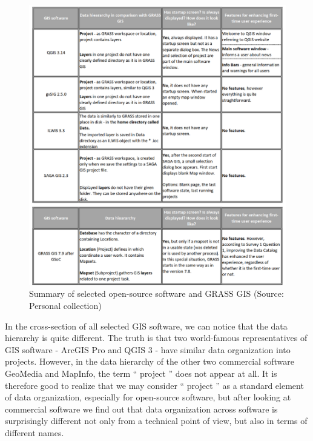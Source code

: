 \documentclass[a4paper,10pt,twoside]{article}
\begin{document}
\vspace{0.3cm}
\begin{figure}[hbt!] 
\begin{center}
\includegraphics[width=15cm]{../pictures/open-source_software.png} 
\caption[Summary of selected open-source software and GRASS GIS]{Summary of selected open-source software and GRASS GIS (Source: Personal collection)}
\label{fig:open-source_software}
\end{center}
\end{figure}


\noindent In the cross-section of all selected GIS software, we can notice that the data hierarchy is quite different. The truth is that two world-famous representatives of GIS software - ArcGIS Pro and QGIS 3 -  have similar data organization into projects. However, in the data hierarchy of the other two commercial software GeoMedia and MapInfo, the term `` project '' does not appear at all. It is therefore good to realize that we may consider `` project '' as a standard element of data organization, especially for open-source software, but after looking at commercial software we find out that data organization across software is surprisingly different not only from a technical point of view, but also in terms of different names.
\end{document}
